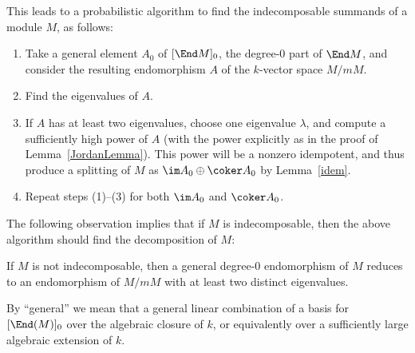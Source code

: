 \documentclass{article}
\let\l\lambda
\numberwithin{equation}{section}
\theoremstyle{theorem}
\numberwithin{thm}{section}
\theoremstyle{definition}
\begin{document}
This leads to a probabilistic algorithm to find the indecomposable summands of a module $M$, as follows:
\begin{enumerate}
\item \label{1} Take a general element $A_0$ of $[\End M]_0$, the degree-0 part of $\End M$, and consider the resulting endomorphism $A$ of the $k$-vector space $M/mM$.
\item Find the eigenvalues of $A$.
\item If $A$ has at least two eigenvalues, choose one eigenvalue $\l$, and compute a sufficiently high power of $A$ (with the power explicitly as in the proof of Lemma~\ref{JordanLemma}). This power will be a nonzero idempotent, and thus produce a splitting of $M$ as $\im A_0 \oplus \coker A_0$ by Lemma~\ref{idem}.
\item Repeat steps (1)--(3) for both $\im A_0$ and $\coker A_0$.
\end{enumerate}

The following observation implies that if $M$ is indecomposable, then the above algorithm should find the decomposition of $M$:

\begin{lem}
  If $M$ is not indecomposable, then a general degree-0 endomorphism of $M$ reduces to an endomorphism of $M/mM$ with at least two distinct eigenvalues.
\end{lem}

\begin{rem}
  By ``general'' we mean that a general linear combination of a basis for $[\End(M)]_0$ over the algebraic closure of $k$, or equivalently over a sufficiently large algebraic extension of $k$.
\end{rem}
\end{document}
